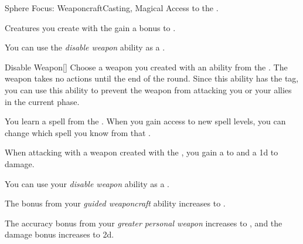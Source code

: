     \begin{feat}{Sphere Focus: Weaponcraft}{Casting, Magical}
        \featpre Access to the  .

         Creatures you create with the   gain a  bonus to .

         You can use the \textit{disable weapon} ability as a .
        \begin{freeability}{Disable Weapon}[]
            Choose a weapon you created with an ability from the  .
            The weapon takes no actions until the end of the round.
            Since this ability has the  tag, you can use this ability to prevent the weapon from attacking you or your allies in the current phase.
        \end{freeability}

         You learn a spell from the  .
        When you gain access to new spell levels, you can change which spell you know from that .

         When attacking with a weapon created with the  , you gain a   to  and a \plus1d  to damage.

         You can use your \textit{disable weapon} ability as a .

         The bonus from your \textit{guided weaponcraft} ability increases to .

         The accuracy bonus from your \textit{greater personal weapon} increases to , and the damage bonus increases to \plus2d.
    \end{feat}

